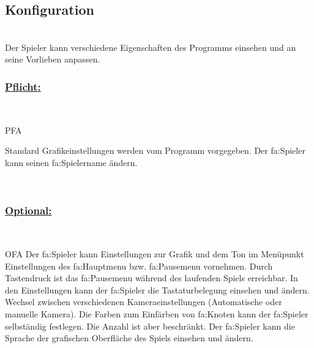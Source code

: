 %
%


\subsection{Konfiguration}

%
%
\renewcommand{\K}{}
%
%

~\\
Der Spieler kann verschiedene Eigenschaften des Programms einsehen und an seine Vorlieben anpassen.
\\

%
%
\subsubsection*{\underline{Pflicht:}}~\\

\begin{ids}{\gls{PFA\K}}

 	\id[ 10] Standard Grafikeinstellungen werden vom Programm vorgegeben. 	
 	\id[ 20] Der \gls{fa:Spieler} kann seinen \gls{fa:Spielername} ändern. 	
	
\end{ids}

~\\


%
%
\subsubsection*{\underline{Optional:}}~\\


\begin{ids}{\gls{OFA\K}}
	\id[ 30] Der \gls{fa:Spieler} kann Einstellungen zur Grafik und dem Ton im Menüpunkt Einstellungen des \gls{fa:Hauptmenu} bzw. \gls{fa:Pausemenu} vornehmen.
	\id[ 40] Durch Tastendruck ist das \gls{fa:Pausemenu} während des laufenden Spiels erreichbar.	
	\id[ 50] In den Einstellungen kann der \gls{fa:Spieler} die Tastaturbelegung einsehen und  ändern.
 	\id[60] Wechsel zwischen verschiedenen Kameraeinstellungen (Automatische oder manuelle Kamera).
 	\id[ 70] Die Farben zum Einfärben von \gls{fa:Knoten} kann der \gls{fa:Spieler} selbständig festlegen. Die Anzahl ist aber beschränkt.
 	\id[ 80] Der \gls{fa:Spieler} kann die Sprache der grafischen Oberfläche des Spiels einsehen und ändern.
 	
 	
	
\end{ids}

~\\
